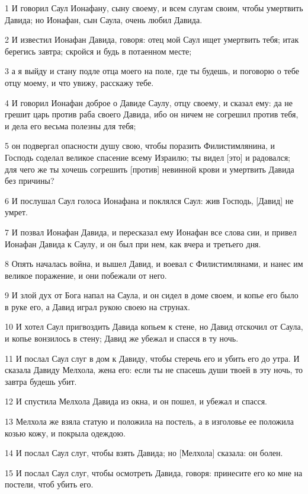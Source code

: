 \par 1 И говорил Саул Ионафану, сыну своему, и всем слугам своим, чтобы умертвить Давида; но Ионафан, сын Саула, очень любил Давида.
\par 2 И известил Ионафан Давида, говоря: отец мой Саул ищет умертвить тебя; итак берегись завтра; скройся и будь в потаенном месте;
\par 3 а я выйду и стану подле отца моего на поле, где ты будешь, и поговорю о тебе отцу моему, и что увижу, расскажу тебе.
\par 4 И говорил Ионафан доброе о Давиде Саулу, отцу своему, и сказал ему: да не грешит царь против раба своего Давида, ибо он ничем не согрешил против тебя, и дела его весьма полезны для тебя;
\par 5 он подвергал опасности душу свою, чтобы поразить Филистимлянина, и Господь соделал великое спасение всему Израилю; ты видел [это] и радовался; для чего же ты хочешь согрешить [против] невинной крови и умертвить Давида без причины?
\par 6 И послушал Саул голоса Ионафана и поклялся Саул: жив Господь, [Давид] не умрет.
\par 7 И позвал Ионафан Давида, и пересказал ему Ионафан все слова сии, и привел Ионафан Давида к Саулу, и он был при нем, как вчера и третьего дня.
\par 8 Опять началась война, и вышел Давид, и воевал с Филистимлянами, и нанес им великое поражение, и они побежали от него.
\par 9 И злой дух от Бога напал на Саула, и он сидел в доме своем, и копье его было в руке его, а Давид играл рукою своею на струнах.
\par 10 И хотел Саул пригвоздить Давида копьем к стене, но Давид отскочил от Саула, и копье вонзилось в стену; Давид же убежал и спасся в ту ночь.
\par 11 И послал Саул слуг в дом к Давиду, чтобы стеречь его и убить его до утра. И сказала Давиду Мелхола, жена его: если ты не спасешь души твоей в эту ночь, то завтра будешь убит.
\par 12 И спустила Мелхола Давида из окна, и он пошел, и убежал и спасся.
\par 13 Мелхола же взяла статую и положила на постель, а в изголовье ее положила козью кожу, и покрыла одеждою.
\par 14 И послал Саул слуг, чтобы взять Давида; но [Мелхола] сказала: он болен.
\par 15 И послал Саул слуг, чтобы осмотреть Давида, говоря: принесите его ко мне на постели, чтоб убить его.
